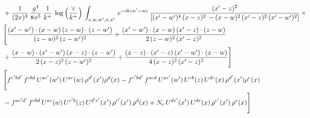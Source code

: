 \documentclass[9pt]{article}
\numberwithin{equation}{section}
\begin{document}
\begin{align}
&  + \frac{1}{(2\pi)^{3}}\, \frac{g^{4}}{8\pi^{5}}\,\frac{1}{k^{+}}\,\log{\left(\frac{\vee}{k^{+}}\right)}\,\int_{z,w,w^{\prime},x,x'}\, e^{-ik(w^{\prime}-w)}\, \frac{(x'-z)^{2}}{\left[(x'-w')^{4}\,(x-z)^{2}\, - (x-w)^{2}\, (x'-z)^{2}\,(x'-w')^{2}\right]}\,  \times\notag \\ & \Bigg[\frac{(x'-w')\cdot (x-w)\, (z-w)\cdot (z-w')}{(z-w)^{2}\, (z-w')^{2}}+\frac{(x'-w')\cdot (x-w)\, (x'-z)\cdot (z-w)}{2\, (z-w)^{2}\, (x'-z)^{2}}\notag \\ & +\frac{(x-w)\cdot (x'-w')\, (x-z)\cdot (z-w')}{2\, (x-z)^{2}\, (z-w')^{2}}+\frac{(x-z)\cdot (x'-z)\, (x'-w')\cdot (x-w)}{4\, (x-z)^{2}\, (x'-z)^{2}}\Bigg] \notag \\ & \Bigg[f^{c'bd'}\,f^{cbd}\, U^{ac'}(w')\,U^{ac}(w)\,\rho^{d'}(x')\rho^{d}(x)- f^{c'bd'}\,f^{acd}\,U^{ac'}(w')\,U^{cb}(z)\,U^{de}(x)\,\rho^{d'}(x')\rho^{e}(x) \notag \\ & -f^{ac'd'}\,f^{cbd}\,U^{ac}(w)\,U^{c'b}(z)\,U^{d'e'}(x')\,\rho^{e'}(x')\,\rho^{d}(x) +N_{c}\,U^{de'}(x')\,U^{de}(x)\,\rho^{e'}(x')\,\rho^{e}(x)\Bigg]
\end{align}
\end{document}
